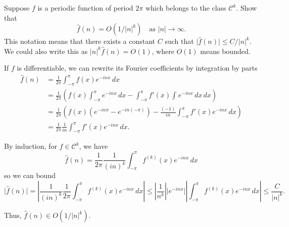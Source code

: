 \documentclass[12 pt, letterpaper]{hmcpset}
\begin{document}
\pagebreak

\begin{problem}[S \& S \S 2.6 \# 10.]
	Suppose $f$ is a periodic function of period $2 \pi$ which belongs to the class $\mathcal{C}^{k}$. Show that
	\[
		\hat{f}(n) = O(1/\lvert n \rvert^{k}) \quad \text{as } \lvert n \rvert \to \infty.
	\]
	This notation means that there exists a constant $C$ such that $\lvert \hat{f}(n) \rvert \le C / \lvert n \rvert^{k}$. We could also write this as $\lvert n \rvert^{k} \hat{f}(n) = O(1)$, where $O(1)$ means bounded.
\end{problem}

\begin{solution}
	If $f$ is differentiable, we can rewrite its Fourier coefficients by integration by parts
	\begin{align*}
		\hat{f}(n) & = \frac{1}{2 \pi} \int_{-\pi}^{\pi} f(x) e^{-i n x} \, dx \\
			   & = \frac{1}{2 \pi} \left ( f(x) \int_{-\pi}^{\pi} e^{-i n x} \, dx - \int_{-\pi}^{\pi} f'(x) \int_{} e^{-i n x} \, dx  \, dx   \right ) \\
			   & = \frac{1}{2 \pi} \left ( f(x) (e^{- i n \pi} - e^{-i n (-\pi)}) - \frac{(-1)}{i n} \int_{-\pi}^{\pi} f'(x) e^{-i n x} \, dx  \right )\\
			   & = \frac{1}{2 \pi} \frac{1}{in} \int_{-\pi}^{\pi} f'(x) e^{-i n x} \, dx.
	\end{align*}

	By induction, for $f \in \mathcal{C}^{k}$, we have
	\[
		\hat{f}(n) = \frac{1}{2 \pi} \frac{1}{(i n)^{k}} \int_{-\pi}^{\pi} f^{(k)}(x) e^{-i n x} \, dx
	\]
	so we can bound
	\[
		\lvert \hat{f}(n) \rvert = \left \lvert \frac{1}{(i n)^{k}} \frac{1}{2 \pi} \int_{-\pi}^{\pi} f^{(k)}(x) e^{-i n x} \, dx  \right \rvert \le \left \lvert \frac{1}{n^{k}} \right \rvert \lvert e^{-i n x} \rvert \left \lvert \int_{-\pi}^{\pi} f^{(k)}(x) e^{-i n x} \, dx  \right \rvert \le \frac{C}{\lvert n \rvert^{k}}.
	\]

	Thus, $\hat{f}(n) \in O(1 / \lvert n \rvert^{k})$.
\end{solution}
\end{document}
